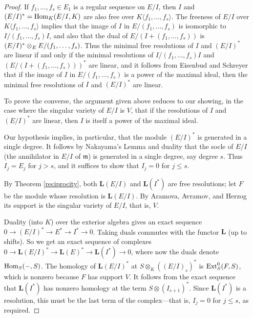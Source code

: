 \documentclass{tran-l}
\theoremstyle{definition}
\theoremstyle{remark}
\newcommand{\LL}{{\mathbf{L}}}
\newcommand{\gm}{{\mathfrak m}}
\newcommand{\Hom}{\mathop{\rm Hom}\nolimits}
\newcommand{\Ext}{\mathop{\rm Ext}\nolimits}
\begin{document}
\begin{proof} If $f_1,\dots,f_s\in E_1$ is a regular sequence on
$E/I$, then $I$ and $(E/I)^*
\linebreak  
=\Hom_K(E/I,K)$ are also free
over 
$K\langle f_1,\dots,f_s\rangle$. The freeness of
$E/I$ over\linebreak  
 $K\langle f_1,\dots,f_s\rangle$ implies that
the image of $I$ in $E/(f_1,\dots,f_s)$ is
isomorphic to\linebreak 
$I/(f_1,\dots,f_s)I$, and also that the dual
of $E/(I+(f_1,\dots,f_s))$ is $(E/I)^*\otimes_E\linebreak E/(f_1,\dots,f_s)$.
Thus the minimal  free
resolutions of $I$ and $(E/I)^*$ are linear if and
only if the minimal resolutions of 
$I/(f_1,\dots,f_s)I$ and $(E/(I+(f_1,\dots,f_s)))^*$
are linear, and it follows from  Eisenbud and 
Schreyer \cite[Section 5]{ES} that if the image of
$I$ in $E/(f_1,\dots,f_s)$ is a power of the maximal ideal,
then the minimal free resolutions of $I$ and $(E/I)^*$ are
linear.

To prove the converse, the argument given above
reduces to our showing, in the case where the singular variety
of $E/I$ is $V$, that if the resolutions of $I$ and $(E/I)^*$
are linear, then $I$ is itself a power of the maximal ideal.

Our hypothesis implies, in particular, that  the module $(E/I)^*$ is generated
in a single degree. It follows by Nakayama's Lemma and duality 
that the socle of $E/I$ (the annihilator in $E/I$ of $\gm$)
is generated in a single degree, say degree $s$. Thus 
$I_j=E_j$ for $j>s$,
and it suffices to show that $I_j=0$ for $j\leq s$.

By Theorem \ref{reciprocity}, both $\LL(E/I)$ and 
$\LL(I^*)$ are free resolutions; let $F$ be the
module whose resolution is $\LL(E/I)$. 
By Aramova, Avramov, and Herzog \cite{AAH} its support is
the singular variety of $E/I$, that is, $V$.

Duality (into $ K$) over the 
exterior algebra gives an exact sequence
$0\to (E/I)^*\to E^*\to I^*\to 0$. Taking duals commutes
with the functor $\LL$ (up to shifts). So we get an exact sequence
of complexes
$0\to \LL(E/I)^*\to \LL(E)^*\to \LL(I^*)\to 0$, where
now the duals denote $\Hom_S(-, S)$. The homology
of $\LL(E/I)^*$ at $S\otimes_K ((E/I)_s)^*$
is $\Ext_S^0(F,S)$, which is nonzero because $F$
has support $V$. It follows from the exact sequence that 
$\LL(I^*)$ has nonzero homology at the term
$S\otimes (I_{s+1})^*$. Since $\LL(I^*)$ is a resolution,
this must be the last term of the complex---that is,
$I_j=0$ for $j\leq s$, as required.
\end{proof}
\end{document}
